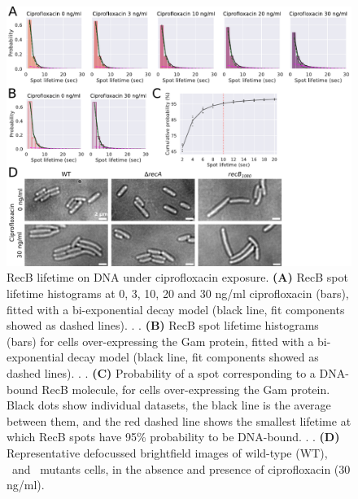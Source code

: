 \begin{figure}[htbp]
    \centering
    \includegraphics[width=.8\textwidth]{Figures/Fig2_RecB_lifetime.pdf}
    \caption{RecB lifetime on DNA under ciprofloxacin exposure. \textbf{(A)} RecB spot lifetime histograms at 0, 3, 10, 20 and 30 ng/ml ciprofloxacin (bars), fitted with a bi-exponential decay model (black line, fit components showed as dashed lines). . . \textbf{(B)} RecB spot lifetime histograms (bars) for cells over-expressing the Gam protein, fitted with a bi-exponential decay model (black line, fit components showed as dashed lines). . . \textbf{(C)} Probability of a spot corresponding to a DNA-bound RecB molecule, for cells over-expressing the Gam protein. Black dots show individual datasets, the black line is the average between them, and the red dashed line shows the smallest lifetime at which RecB spots have 95\% probability to be DNA-bound. . . \textbf{(D)} Representative defocussed brightfield images of wild-type (WT), \dreca\ and \geneteneighty\ mutants cells, in the absence and presence of ciprofloxacin (30 ng/ml).}
    \label{Fig:lifetimes}
\end{figure}

